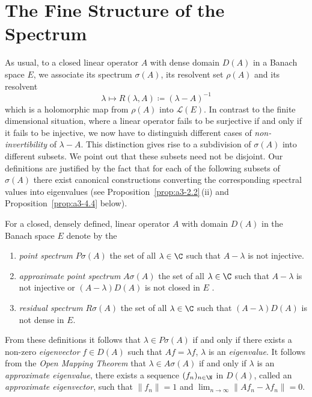 \section{The Fine Structure of the Spectrum}\label{sec:a3-2}%
As usual, to a closed linear operator $A$ with dense domain $D(A)$ in a Banach space $E$, we associate its spectrum $\sigma(A)$, its resolvent set
$\rho(A)$ and its resolvent 
\[
    \lambda \mapsto R(\lambda,A) \coloneqq (\lambda - A)^{-1}
\]
which is a holomorphic map from $\rho(A)$ into $\mathcal{L}(E)$.
In contrast to the finite dimensional situation, where a linear operator fails to be surjective if and only if it fails to be injective, we now have to distinguish different cases of \emph{non-invertibility} of\/ $\lambda - A$.
This distinction gives rise to a subdivision of\/ $\sigma(A)$ into different subsets.
We point out that these subsets need not be disjoint. Our definitions are
justified by the fact that for each of the following subsets of\/ $\sigma(A)$ there exist canonical constructions converting the corresponding spectral values into eigenvalues (see Proposition~\ref{prop:a3-2.2}\,(ii) and Proposition~\ref{prop:a3-4.4} below).
\begin{definition}\label{def:a3-2.1}
For a closed, densely defined, linear operator $A$ with domain $D(A)$ in the Banach space $E$ denote by the
\begin{enumerate}[\upshape (i)]
\item 
\emph{point spectrum} $P\sigma(A)$ the set of all $\lambda \in \C$ such that 
$A - \lambda$ is not injective.

\item 
\emph{approximate point spectrum}
$A\sigma(A)$ the set of all $\lambda \in \C$ such that $A - \lambda$ is not injective or $(A - \lambda)D(A)$ is not closed in $E$ .

\item 
\emph{residual spectrum} $R\sigma(A)$ the set of all $\lambda \in \C$ such that $(A - \lambda)D(A)$ is not dense in $E$.
\end{enumerate}
\end{definition}
From these definitions it follows that $\lambda \in P\sigma(A)$ if and only if there exists a non-zero \emph{eigenvector}%
$f \in D(A)$ such that $Af = \lambda f$, \ie $\lambda$ is an \emph{eigenvalue}.
It follows from the \emph{Open Mapping Theorem} that $\lambda \in A\sigma(A)$ if and only if\/ $\lambda$ is an \emph{approximate eigenvalue}, 
\ie there exists a sequence $(f_{n})_{n \in \N}$ in $D(A)$, called an \emph{approximate eigenvector}, 
such that $\|f_{n}\| = 1$ and $ \lim_{n \to \infty} \|Af_{n} - \lambda f_{n}\| = 0$.

